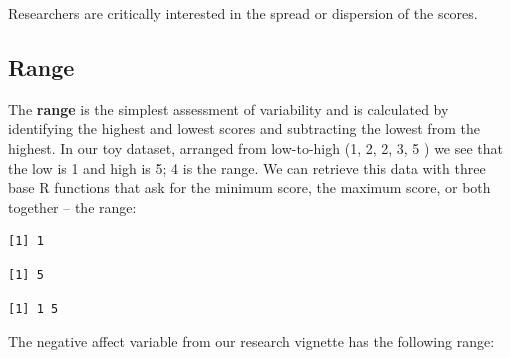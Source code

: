 \documentclass[
  11pt,
]{book}
\newenvironment{Shaded}{\begin{snugshade}}{\end{snugshade}}
\newcommand{\AttributeTok}[1]{\textcolor[rgb]{0.27,0.27,0.27}{#1}}
\newcommand{\ConstantTok}[1]{\textcolor[rgb]{0.37,0.37,0.37}{#1}}
\newcommand{\FunctionTok}[1]{\textcolor[rgb]{0.27,0.27,0.27}{\textbf{#1}}}
\newcommand{\NormalTok}[1]{#1}
\newcommand{\SpecialCharTok}[1]{\textcolor[rgb]{0.43,0.43,0.43}{\textbf{#1}}}
\begin{document}
Researchers are critically interested in the spread or dispersion of the scores.

\hypertarget{range}{%
\subsection{Range}\label{range}}

The \textbf{range} is the simplest assessment of variability and is calculated by identifying the highest and lowest scores and subtracting the lowest from the highest. In our toy dataset, arranged from low-to-high (1, 2, 2, 3, 5 ) we see that the low is 1 and high is 5; 4 is the range. We can retrieve this data with three base R functions that ask for the minimum score, the maximum score, or both together -- the range:

\begin{Shaded}
\end{Shaded}

\begin{verbatim}
[1] 1
\end{verbatim}

\begin{Shaded}
\end{Shaded}

\begin{verbatim}
[1] 5
\end{verbatim}

\begin{Shaded}
\end{Shaded}

\begin{verbatim}
[1] 1 5
\end{verbatim}

The negative affect variable from our research vignette has the following range:
\end{document}
